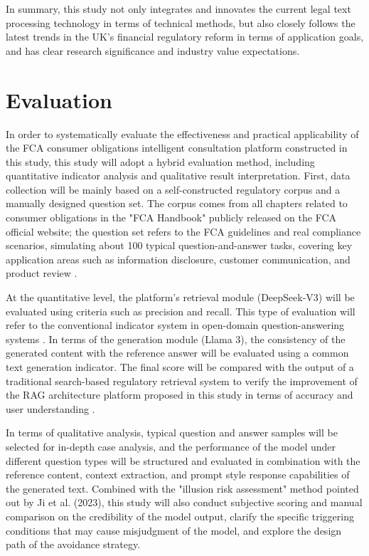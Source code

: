 \documentclass[a4paper,11pt]{article}
\begin{document}
In summary, this study not only integrates and innovates the current legal text processing technology in terms of technical methods, but also closely follows the latest trends in the UK's financial regulatory reform in terms of application goals, and has clear research significance and industry value expectations.

\section{Evaluation}

In order to systematically evaluate the effectiveness and practical applicability of the FCA consumer obligations intelligent consultation platform constructed in this study, this study will adopt a hybrid evaluation method, including quantitative indicator analysis and qualitative result interpretation. First, data collection will be mainly based on a self-constructed regulatory corpus and a manually designed question set. The corpus comes from all chapters related to consumer obligations in the "FCA Handbook" publicly released on the FCA official website; the question set refers to the FCA guidelines and real compliance scenarios, simulating about 100 typical question-and-answer tasks, covering key application areas such as information disclosure, customer communication, and product review \cite{fca2023}.

At the quantitative level, the platform's retrieval module (DeepSeek-V3) will be evaluated using criteria such as precision and recall. This type of evaluation will refer to the conventional indicator system in open-domain question-answering systems \cite{karpukhin2020dense}. In terms of the generation module (Llama 3), the consistency of the generated content with the reference answer will be evaluated using a common text generation indicator. The final score will be compared with the output of a traditional search-based regulatory retrieval system to verify the improvement of the RAG architecture platform proposed in this study in terms of accuracy and user understanding \cite{zhang2023regtech}.

In terms of qualitative analysis, typical question and answer samples will be selected for in-depth case analysis, and the performance of the model under different question types will be structured and evaluated in combination with the reference content, context extraction, and prompt style response capabilities of the generated text. Combined with the "illusion risk assessment" method pointed out by Ji et al. (2023), this study will also conduct subjective scoring and manual comparison on the credibility of the model output, clarify the specific triggering conditions that may cause misjudgment of the model, and explore the design path of the avoidance strategy.
\end{document}
